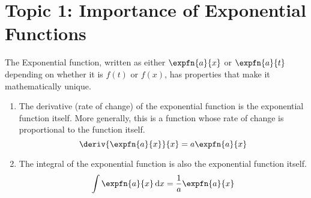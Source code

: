 \documentclass[../notes-main.tex]{subfiles}
\begin{document}
\section{Topic 1: Importance of Exponential Functions}
The Exponential function, written as either
\(\expfn{a}{x}\) or \(\expfn{a}{t}\) depending on whether it is \(f(t)\) or \(f(x)\),
has properties that make it mathematically unique.
\begin{enumerate}
    \item The derivative (rate of change) of the exponential function is the exponential function itself. More generally, this is a function whose rate of change is proportional to the function itself.
          \begin{equation}
              \deriv{\expfn{a}{x}}{x} = a\expfn{a}{x}
              \label{eq:exp-deriv}
          \end{equation}
    \item The integral of the exponential function is also the exponential function itself.
          \begin{equation}
              \int \expfn{a}{x} \dif x = \frac{1}{a}\expfn{a}{x}
              \label{eq:exp-integral}
          \end{equation}
\end{enumerate}
\end{document}
